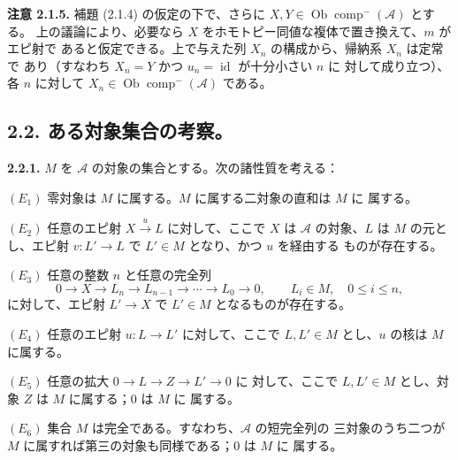 \clearpage
{}%
\begingroup\small\setlength{\parskip}{0pt}\setlength{\emergencystretch}{1.5em}
\setlength{\abovedisplayskip}{4pt plus 2pt minus 2pt}%
\setlength{\belowdisplayskip}{4pt plus 2pt minus 2pt}%

\noindent\textbf{注意 2.1.5.}\quad
補題 (2.1.4) の仮定の下で、さらに
$X,Y\in\operatorname{Ob}\operatorname{comp}^{-}(\mathcal A)$ とする。
上の議論により、必要なら $X$ をホモトピー同値な複体で置き換えて、$m$ がエピ射で
あると仮定できる。上で与えた列 $X_n$ の構成から、帰納系 $X_n$ は定常で
あり（すなわち $X_n=Y$ かつ $u_n=\operatorname{id}$ が十分小さい $n$ に
対して成り立つ）、各 $n$ に対して
$X_n\in\operatorname{Ob}\operatorname{comp}^{-}(\mathcal A)$ である。

\subsection*{2.2. ある対象集合の考察。}

\noindent\textbf{2.2.1.}\quad
$M$ を $\mathcal A$ の対象の集合とする。次の諸性質を考える：

\noindent $(E_1)$ 零対象は $M$ に属する。$M$ に属する二対象の直和は $M$ に
属する。

\noindent $(E_2)$ 任意のエピ射 $X\xrightarrow{u}L$ に対して、ここで
$X$ は $\mathcal A$ の対象、$L$ は $M$ の元とし、エピ射
$v\colon L'\longrightarrow L$ で $L'\in M$ となり、かつ $u$ を経由する
ものが存在する。

\noindent $(E_3)$ 任意の整数 $n$ と任意の完全列
\[
0\longrightarrow X\longrightarrow L_n\longrightarrow L_{n-1}
\longrightarrow\cdots\longrightarrow L_0\longrightarrow0,
\qquad L_i\in M,\quad 0\le i\le n,
\]
に対して、エピ射 $L'\longrightarrow X$ で $L'\in M$ となるものが存在する。

\noindent $(E_4)$ 任意のエピ射 $u\colon L\longrightarrow L'$ に対して、ここで
$L,L'\in M$ とし、$u$ の核は $M$ に属する。

\noindent $(E_5)$ 任意の拡大
$0\longrightarrow L\longrightarrow Z\longrightarrow L'\longrightarrow0$ に
対して、ここで $L,L'\in M$ とし、対象 $Z$ は $M$ に属する；$0$ は $M$ に
属する。

\noindent $(E_6)$ 集合 $M$ は完全である。すなわち、$\mathcal A$ の短完全列の
三対象のうち二つが $M$ に属すれば第三の対象も同様である；$0$ は $M$ に
属する。

